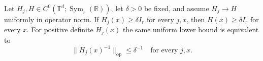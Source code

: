 Let $H_j,H\in C^0(\mathbb T^d;\operatorname{Sym}_r(\mathbb R))$,
let $\delta>0$ be fixed, and assume $H_j\to H$ uniformly in operator norm.
If $H_j(x)\geq\delta I_r$ for every $j,x$, then $H(x)\geq\delta I_r$
for every $x$. For positive definite $H_j(x)$ the same uniform lower bound
is equivalent to
\[
 \|H_j(x)^{-1}\|_{\mathrm{op}}\leq\delta^{-1}
 \quad\text{for every }j,x.
\]